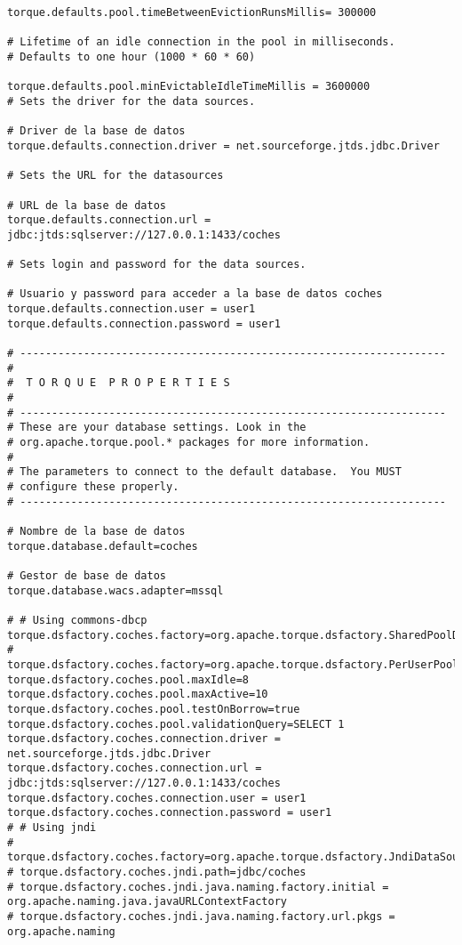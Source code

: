 \begin{lstlisting}
torque.defaults.pool.timeBetweenEvictionRunsMillis= 300000

# Lifetime of an idle connection in the pool in milliseconds.
# Defaults to one hour (1000 * 60 * 60)

torque.defaults.pool.minEvictableIdleTimeMillis = 3600000
# Sets the driver for the data sources.

# Driver de la base de datos
torque.defaults.connection.driver = net.sourceforge.jtds.jdbc.Driver

# Sets the URL for the datasources

# URL de la base de datos
torque.defaults.connection.url = jdbc:jtds:sqlserver://127.0.0.1:1433/coches

# Sets login and password for the data sources.

# Usuario y password para acceder a la base de datos coches
torque.defaults.connection.user = user1
torque.defaults.connection.password = user1

# -------------------------------------------------------------------
#
#  T O R Q U E  P R O P E R T I E S
#
# -------------------------------------------------------------------
# These are your database settings. Look in the
# org.apache.torque.pool.* packages for more information.
#
# The parameters to connect to the default database.  You MUST
# configure these properly.
# -------------------------------------------------------------------

# Nombre de la base de datos
torque.database.default=coches

# Gestor de base de datos
torque.database.wacs.adapter=mssql

# # Using commons-dbcp
torque.dsfactory.coches.factory=org.apache.torque.dsfactory.SharedPoolDataSourceFactory
# torque.dsfactory.coches.factory=org.apache.torque.dsfactory.PerUserPoolDataSourceFactory
torque.dsfactory.coches.pool.maxIdle=8
torque.dsfactory.coches.pool.maxActive=10
torque.dsfactory.coches.pool.testOnBorrow=true
torque.dsfactory.coches.pool.validationQuery=SELECT 1
torque.dsfactory.coches.connection.driver = net.sourceforge.jtds.jdbc.Driver
torque.dsfactory.coches.connection.url = jdbc:jtds:sqlserver://127.0.0.1:1433/coches
torque.dsfactory.coches.connection.user = user1
torque.dsfactory.coches.connection.password = user1
# # Using jndi
# torque.dsfactory.coches.factory=org.apache.torque.dsfactory.JndiDataSourceFactory
# torque.dsfactory.coches.jndi.path=jdbc/coches
# torque.dsfactory.coches.jndi.java.naming.factory.initial = org.apache.naming.java.javaURLContextFactory
# torque.dsfactory.coches.jndi.java.naming.factory.url.pkgs = org.apache.naming


\end{lstlisting}
